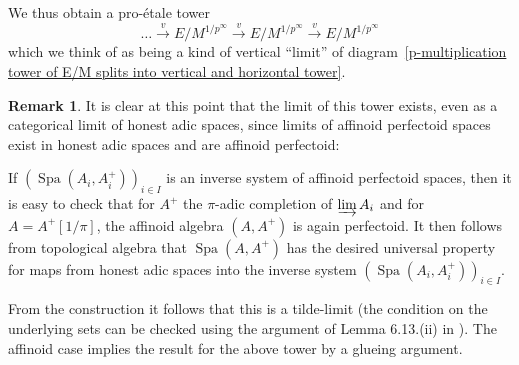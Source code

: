 \documentclass[10pt,oneside]{amsart}
\theoremstyle{definition}
\newtheorem{remark}[theorem]{Remark}
\begin{document}
	We thus obtain a pro-\'etale tower
	\begin{equation}\label{proetale tower in the vertical limit}
	\dots \xrightarrow{v}E/M^{1/p^\infty}\xrightarrow{v} E/M^{1/p^\infty}\xrightarrow{v} E/M^{1/p^\infty}
	\end{equation}
	which we think of as being a kind of vertical ``limit'' of diagram~\ref{p-multiplication tower of E/M splits into vertical and horizontal tower}. 
	\begin{remark}\label{projective limits of perfectoid spaces as adic spaces}
	It is clear at this point that the limit of this tower exists, even as a categorical limit of honest adic spaces, since limits of affinoid perfectoid spaces exist in honest adic spaces and are affinoid perfectoid:
	
	If $(\operatorname{Spa}(A_i,A_i^{+}))_{i\in I}$ is an inverse system of affinoid perfectoid spaces, then it is easy to check that for $A^+$ the $\pi$-adic completion of $\varinjlim A_i$ and for $A = A^+[1/\pi]$, the affinoid algebra $(A,A^{+})$ is again perfectoid. It then follows from topological algebra that $\operatorname {Spa}(A,A^{+})$ has the desired universal property for maps from honest adic spaces into the inverse system $(\operatorname{Spa}(A_i,A_i^{+}))_{i\in I}$.
	
	From the construction it follows that this is a tilde-limit (the condition on the underlying sets can be checked using the argument of Lemma 6.13.(ii) in \cite{perfectoid}). The affinoid case implies the result for the above tower by a glueing argument.
	\end{remark}
	
\end{document}
